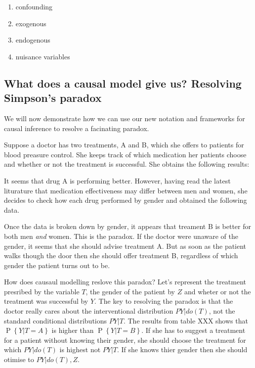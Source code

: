 \documentclass[11pt,a4paper,oneside]{book}
\renewcommand{\P}[1]{\operatorname{P}\left\{#1\right\}}
\begin{document}
\begin{enumerate}
\item confounding
\item exogenous
\item endogenous
\item nuisance variables
\end{enumerate} 

\subsection*{What does a causal model give us? Resolving Simpson's paradox}

We will now demonstrate how we can use our new notation and frameworks for causal inference to resolve a facinating paradox. 

Suppose a doctor has two treatments, A and B, which she offers to patients for blood preasure control. She keeps track of which medication her patients choose and whether or not the treatment is successful. She obtains the following results:


It seems that drug A is performing better. However, having read the latest liturature that medication effectiveness may differ between men and women, she decides to check how each drug performed by gender and obtained the following data.


Once the data is broken down by gender, it appears that treament B is better for both men \emph{and} women. This is the paradox. If the doctor were unaware of the gender, it seems that she should advise treatment A. But as soon as the patient walks though the door  then she should offer treatment B, regardless of which gender the patient turns out to be. 

How does causaul modelling reslove this paradox? Let's represent the treatment presribed by the variable $T$, the gender of the patient by $Z$ and wheter or not the treatment was successful by $Y$. The key to resolving the paradox is that the doctor really cares about the interventional distribution $P{Y|do(T)}$, not the standard conditional distributions $P{Y|T}$. The results from table XXX shows that $\P{Y|T=A}$ is higher than $\P{Y|T=B}$. If she has to suggest a treatment for a patient without knowing their gender, she should choose the treatment for which $P{Y|do(T)}$ is highest not $P{Y|T}$. If she knows thier gender then she should otimise to $P{Y|do(T),Z}$. 
\end{document}

